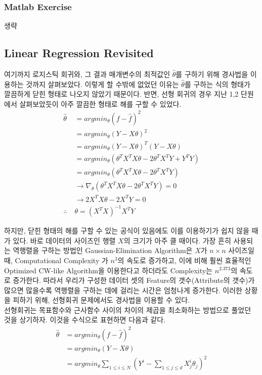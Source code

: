 \documentclass[a4paper]{oblivoir}
\begin{document}
\subsubsection{Matlab Exercise}
생략

\subsection{Linear Regression Revisited}
여기까지 로지스틱 회귀와, 그 결과 매개변수의 최적값인 $\hat{\theta}$를 구하기 위해 경사법을 이용하는 것까지 살펴보았다. 이렇게 할 수밖에 없었던 이유는 $\hat{\theta}$를 구하는 식의 형태가 깔끔하게 닫힌 형태로 나오지 않았기 때문이다. 반면, 선형 회귀의 경우 지난 1,2 단원에서 살펴보았듯이 아주 깔끔한 형태로 해를 구할 수 있었다.
\begin{align*}
\hat{\theta} &= argmin_{\theta}(f-\hat{f})^{2} \tag{4-52} \\
&= argmin_{\theta}(Y-X\theta)^{2} \tag{4-53} \\
&= argmin_{\theta}(Y-X\theta)^{T}(Y-X\theta) \tag{4-54} \\
&= argmin_{\theta}(\theta^{T}X^{T}X\theta - 2\theta^{T}X^{T}Y + Y^{T}Y) \tag{4-55} \\
&= argmin_{\theta}(\theta^{T}X^{T}X\theta - 2\theta^{T}X^{T}Y) \tag{4-56} \\
&\to \nabla_{\theta}(\theta^{T}X^{T}X\theta - 2\theta^{T}X^{T}Y) = 0 \tag{4-57} \\
&\to 2X^{T}X\theta - 2X^{T}Y = 0 \tag{4-58} \\
\therefore \; &\theta = (X^{T}X)^{-1}X^{T}Y \tag{4-59}
\end{align*}

\indent 하지만, 닫힌 형태의 해를 구할 수 있는 공식이 있음에도 이를 이용하기가 쉽지 않을 때가 있다. 바로 데이터의 사이즈인 행렬 $X$의 크기가 아주 클 때이다. 가장 흔히 사용되는 역행렬을 구하는 방법인 Gaussian-Elimination Algorithm은 $X$가 $n \times n$ 사이즈일 때, Computational Complexity 가 $n^{3}$의 속도로 증가하고, 이에 비해 훨씬 효율적인 Optimized CW-like Algorithm을 이용한다고 하더라도 Complexity는 $n^{2.373}$의 속도로 증가한다. 따라서 우리가 구성한 데이터 셋의 Feature의 갯수(Attribute의 갯수)가 많으면 많을수록 역행렬을 구하는 데에 걸리는 시간은 엄청나게 증가한다. 이러한 상황을 피하기 위해, 선형회귀 문제에서도 경사법을 이용할 수 있다. \\
\indent 선형회귀는 목표함수와 근사함수 사이의 차이의 제곱을 최소화하는 방법으로 풀었던 것을 상기하자. 이것을 수식으로 표현하면 다음과 같다.
\begin{align*}
\hat{\theta} &= argmin_{\theta}(f-\hat{f})^{2} \tag{4-60} \\
&= argmin_{\theta} (Y-X\theta) \tag{4-61} \\
&= argmin_{\theta} \sum_{1 \leq i \leq N}(Y^{i} - \sum_{1 \leq j \leq d}X_{j}^{i}\theta_{j})^{2} \tag{4-62}
\end{align*}
\end{document}
